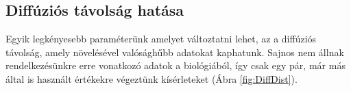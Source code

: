 \begin{minipage}{\linewidth}
\begin{multicols}{3}
\begin{Figure}
		\end{Figure}
	\end{multicols}
\end{minipage}


\subsection{Diffúziós távolság hatása}

Egyik legkényesebb paraméterünk amelyet változtatni lehet, az a diffúziós távolság, amely növelésével valósághűbb adatokat kaphatunk. Sajnos nem állnak rendelkezésünkre erre vonatkozó adatok a biológiából, így csak egy pár, már más által is használt értékekre végeztünk kísérleteket (Ábra \ref{fig:DiffDist}).

